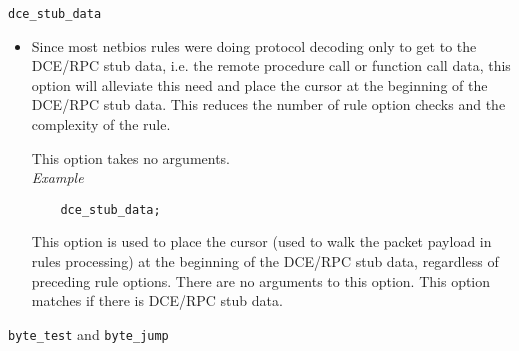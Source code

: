 \documentclass[english]{report}
\begin{document}
\texttt{dce\_stub\_data}
\label{dcerpc2:dce_stub_data}
\begin{itemize}

\item[] Since most netbios rules were doing protocol decoding only to get to
the DCE/RPC stub data, i.e. the remote procedure call or function call data,
this option will alleviate this need and place the cursor at the beginning of
the DCE/RPC stub data. This reduces the number of rule option checks and the
complexity of the rule.

This option takes no arguments.\\

\textit{Example}
\footnotesize
\begin{verbatim}
    dce_stub_data;
\end{verbatim}
\normalsize

This option is used to place the cursor (used to walk the packet payload in
rules processing) at the beginning of the DCE/RPC stub data, regardless of
preceding rule options. There are no arguments to this option.  This option
matches if there is DCE/RPC stub data.

\end{itemize}
\texttt{byte\_test} and \texttt{byte\_jump}\label{dcerpc2:byte_test_jump}
\end{document}
